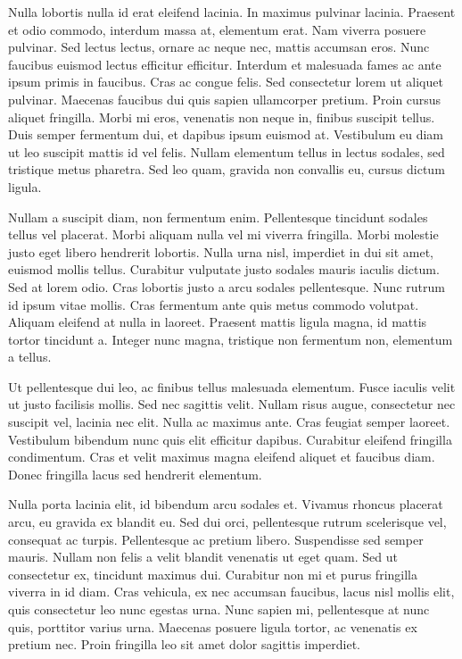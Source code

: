 Nulla lobortis nulla id erat eleifend lacinia. In maximus pulvinar lacinia. Praesent et odio commodo, interdum massa at, elementum erat. Nam viverra posuere pulvinar. Sed lectus lectus, ornare ac neque nec, mattis accumsan eros. Nunc faucibus euismod lectus efficitur efficitur. Interdum et malesuada fames ac ante ipsum primis in faucibus. Cras ac congue felis. Sed consectetur lorem ut aliquet pulvinar. Maecenas faucibus dui quis sapien ullamcorper pretium. Proin cursus aliquet fringilla. Morbi mi eros, venenatis non neque in, finibus suscipit tellus. Duis semper fermentum dui, et dapibus ipsum euismod at. Vestibulum eu diam ut leo suscipit mattis id vel felis. Nullam elementum tellus in lectus sodales, sed tristique metus pharetra. Sed leo quam, gravida non convallis eu, cursus dictum ligula.

Nullam a suscipit diam, non fermentum enim. Pellentesque tincidunt sodales tellus vel placerat. Morbi aliquam nulla vel mi viverra fringilla. Morbi molestie justo eget libero hendrerit lobortis. Nulla urna nisl, imperdiet in dui sit amet, euismod mollis tellus. Curabitur vulputate justo sodales mauris iaculis dictum. Sed at lorem odio. Cras lobortis justo a arcu sodales pellentesque. Nunc rutrum id ipsum vitae mollis. Cras fermentum ante quis metus commodo volutpat. Aliquam eleifend at nulla in laoreet. Praesent mattis ligula magna, id mattis tortor tincidunt a. Integer nunc magna, tristique non fermentum non, elementum a tellus.

Ut pellentesque dui leo, ac finibus tellus malesuada elementum. Fusce iaculis velit ut justo facilisis mollis. Sed nec sagittis velit. Nullam risus augue, consectetur nec suscipit vel, lacinia nec elit. Nulla ac maximus ante. Cras feugiat semper laoreet. Vestibulum bibendum nunc quis elit efficitur dapibus. Curabitur eleifend fringilla condimentum. Cras et velit maximus magna eleifend aliquet et faucibus diam. Donec fringilla lacus sed hendrerit elementum.

Nulla porta lacinia elit, id bibendum arcu sodales et. Vivamus rhoncus placerat arcu, eu gravida ex blandit eu. Sed dui orci, pellentesque rutrum scelerisque vel, consequat ac turpis. Pellentesque ac pretium libero. Suspendisse sed semper mauris. Nullam non felis a velit blandit venenatis ut eget quam. Sed ut consectetur ex, tincidunt maximus dui. Curabitur non mi et purus fringilla viverra in id diam. Cras vehicula, ex nec accumsan faucibus, lacus nisl mollis elit, quis consectetur leo nunc egestas urna. Nunc sapien mi, pellentesque at nunc quis, porttitor varius urna. Maecenas posuere ligula tortor, ac venenatis ex pretium nec. Proin fringilla leo sit amet dolor sagittis imperdiet.

